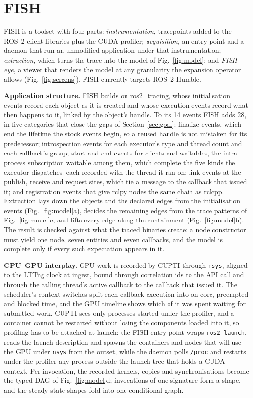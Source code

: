 \section{FISH}
\label{sec:method}
FISH is a toolset with four parts: \emph{instrumentation}, tracepoints added to the ROS~2 client libraries plus the CUDA profiler; \emph{acquisition}, an entry point and a daemon that run an unmodified application under that instrumentation; \emph{extraction}, which turns the trace into the model of Fig.~\ref{fig:model}; and \emph{FISH-eye}, a viewer that renders the model at any granularity the expansion operator allows (Fig.~\ref{fig:screens}). FISH currently targets ROS~2 Humble.

\noindent\textbf{Application structure.} FISH builds on ros2\_tracing, whose initialisation events record each object as it is created and whose execution events record what then happens to it, linked by the object's handle. To its 14 events FISH adds 28, in five categories that close the gaps of Section~\ref{sec:goal}: finalize events, which end the lifetime the stock events begin, so a reused handle is not mistaken for its predecessor; introspection events for each executor's type and thread count and each callback's group; start and end events for clients and waitables, the intra-process subscription waitable among them, which complete the five kinds the executor dispatches, each recorded with the thread it ran on; link events at the publish, receive and request sites, which tie a message to the callback that issued it; and registration events that give rclpy nodes the same chain as rclcpp. Extraction lays down the objects and the declared edges from the initialisation events (Fig.~\ref{fig:model}a), decides the remaining edges from the trace patterns of Fig.~\ref{fig:model}c, and lifts every edge along the containment (Fig.~\ref{fig:model}b). The result is checked against what the traced binaries create: a node constructor must yield one node, seven entities and seven callbacks, and the model is complete only if every such expectation appears in it.

\noindent\textbf{CPU--GPU interplay.} GPU work is recorded by CUPTI through \texttt{nsys}, aligned to the LTTng clock at ingest, bound through correlation ids to the API call and through the calling thread's active callback to the callback that issued it. The scheduler's context switches split each callback execution into on-core, preempted and blocked time, and the GPU timeline shows which of it was spent waiting for submitted work. CUPTI sees only processes started under the profiler, and a container cannot be restarted without losing the components loaded into it, so profiling has to be attached at launch: the FISH entry point wraps \texttt{ros2 launch}, reads the launch description and spawns the containers and nodes that will use the GPU under \texttt{nsys} from the outset, while the daemon polls \texttt{/proc} and restarts under the profiler any process outside the launch tree that holds a CUDA context. Per invocation, the recorded kernels, copies and synchronisations become the typed DAG of Fig.~\ref{fig:model}d; invocations of one signature form a shape, and the steady-state shapes fold into one conditional graph.

